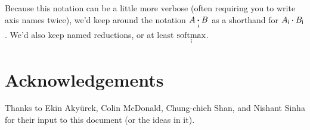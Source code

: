 \documentclass{article}
\begin{document}
Because this notation can be a little more verbose (often requiring you to write axis names twice), we'd keep around the notation $A \ndot{i} B$ as a shorthand for $A_{\name{i}} \cdot B_{\name{i}}$. We'd also keep named reductions, or at least $\nfun{i}{softmax}$.

\section*{Acknowledgements}

Thanks to Ekin Aky\"{u}rek, Colin McDonald, Chung-chieh Shan, and Nishant Sinha for their input to this document (or the ideas in it).

\iffalse %
\section*{References}
\fi



\end{document}
